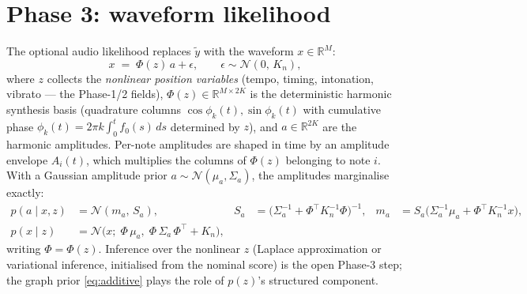\documentclass[11pt,a4paper]{report}
\newcommand{\R}{\mathbb{R}}
\newcommand{\N}{\mathcal{N}}
\begin{document}
\section{Phase 3: waveform likelihood}\label{sec:phase3-math}
The optional audio likelihood replaces $\tilde y$ with the waveform $x \in \R^{M}$:
\begin{equation}
  x \;=\; \Phi(z)\, a + \epsilon, \qquad \epsilon \sim \N(0,\, K_n),
  \label{eq:waveform}
\end{equation}
where $z$ collects the \emph{nonlinear position variables} (tempo, timing,
intonation, vibrato --- the Phase-1/2 fields), $\Phi(z) \in \R^{M \times 2K}$ is the
deterministic harmonic synthesis basis (quadrature columns $\cos\phi_k(t),
\sin\phi_k(t)$ with cumulative phase $\phi_k(t) = 2\pi k \int_0^t f_0(s)\, ds$
determined by $z$), and $a \in \R^{2K}$ are the harmonic amplitudes. Per-note
amplitudes are shaped in time by an amplitude envelope $A_i(t)$, which multiplies
the columns of $\Phi(z)$ belonging to note $i$. With a Gaussian amplitude prior
$a \sim \N(\mu_a, \Sigma_a)$, the amplitudes marginalise exactly:
\begin{align}
  p(a \mid x, z) &= \N(m_a,\, S_a), &
  S_a &= \bigl( \Sigma_a^{-1} + \Phi^\top K_n^{-1} \Phi \bigr)^{-1}, &
  m_a &= S_a \bigl( \Sigma_a^{-1} \mu_a + \Phi^\top K_n^{-1} x \bigr),
  \label{eq:amp-post}\\[2pt]
  p(x \mid z) &= \N\bigl( x;\; \Phi\, \mu_a,\; \Phi\, \Sigma_a\, \Phi^\top + K_n \bigr),
  \label{eq:collapsed}
\end{align}
writing $\Phi = \Phi(z)$. Inference over the nonlinear $z$ (Laplace approximation or
variational inference, initialised from the nominal score) is the open Phase-3 step;
the graph prior \eqref{eq:additive} plays the role of $p(z)$'s structured component.
\end{document}
